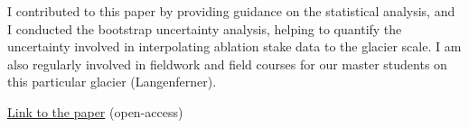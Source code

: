 I contributed to this paper by providing guidance on the statistical analysis,
and I conducted the bootstrap uncertainty analysis, helping to quantify the
uncertainty involved in interpolating ablation stake data to the glacier scale.
I am also regularly involved in fieldwork and field courses for our
master students on this particular glacier (Langenferner).

\href{https://doi.org/10.5194/tc-11-1417-2017}{Link to the paper} (open-access)

\iflong  \else \fi 

